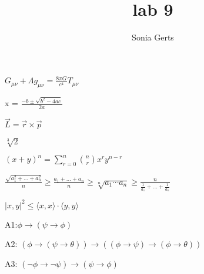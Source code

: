 \documentclass{article}
\title{lab 9}
\author{Sonia Gerts}
\begin{document}
\maketitle





$G_{\mu\nu} + \Lambda g_{\mu\nu} = \frac{8 \pi G}{c^4} T_{\mu\nu}$ 

x = $\frac{{-b \pm \sqrt{b^2 - 4ac}}}{{2a}}$

$\vec{L} = \vec{r} \times \vec{p}$

$\sqrt[3]{2}$

$(x + y)^n = \sum_{r=0}^{n} \binom{n}{r} x^r y^{n-r}$

$\frac{\sqrt{a_1^2+ \dots + a_n^2}}{n}  \geq \frac{a_1 + \dots + a_n}{n} \geq \sqrt[n]{ a_1 \dotsm a_n }\geq \frac{n}{\frac{1}{a_1} + \dots + \frac{1}{a_n}}$

$|x, y|^2 \leq \langle x, x \rangle \cdot \langle y, y \rangle $

A1:$ \phi \rightarrow (\psi \rightarrow \phi) $

A2: $(\phi \rightarrow (\psi \rightarrow \theta)) \rightarrow ((\phi \rightarrow \psi) \rightarrow (\phi \rightarrow \theta))$

A3: $(\neg \phi \rightarrow \neg \psi) \rightarrow (\psi \rightarrow \phi)$
\end{document}
